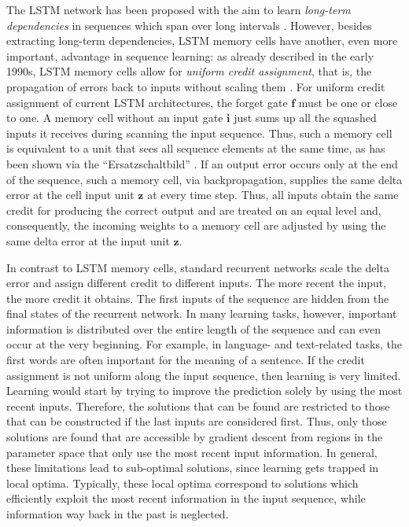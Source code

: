 \documentclass{article}
\newcommand\Bf{\bm{f}}
\newcommand\Bi{\bm{i}}
\newcommand\Bz{\bm{z}}
\begin{document}
\begin{appendices}
The LSTM network has been proposed with the aim
to learn {\em long-term dependencies} in sequences
which span over long intervals
\cite{Hochreiter:97,Hochreiter:97e,Hochreiter:97f,Hochreiter:98}. 
However, besides extracting long-term dependencies, 
LSTM memory cells have another, even
more important, advantage in sequence learning:
as already described in the early 1990s,
LSTM memory cells allow for {\em uniform credit assignment}, that is,
the propagation of errors back to inputs without 
scaling them \cite{Hochreiter:91}. 
For uniform credit assignment of current LSTM architectures,
the forget gate $\Bf$ must be one or close to one.  
A memory cell without an input gate $\Bi$ just sums up all the squashed inputs it
receives during scanning the input sequence.
Thus, such a memory cell is equivalent to a unit that sees all sequence
elements at the same time, as has been shown via 
the ``Ersatzschaltbild'' \cite{Hochreiter:91}.
If an output error occurs only at the end of the sequence,
such a memory cell, via backpropagation, supplies
the same delta error at the cell input unit $\Bz$ at every time
step.
Thus, all inputs obtain the same credit for producing the correct
output and are treated on an equal level and, consequently, the incoming weights to a memory cell 
are adjusted by using the same delta error at the input unit $\Bz$.

In contrast to LSTM memory cells, standard recurrent networks scale
the delta error and assign different credit to different inputs.
The more recent the input, the more credit it obtains.
The first inputs of the sequence are hidden from the final states of
the recurrent network.
In many learning tasks, however, important information is distributed over
the entire length of the sequence and can even occur at the very beginning. For
example, in language- and text-related tasks, 
the first words are often important for the meaning of a sentence. 
If the credit assignment is not uniform along the input sequence, then
learning is very limited. Learning would start by trying to improve
the prediction solely by using the most recent inputs.
Therefore, the solutions that can be found are restricted to those
that can be constructed if the last inputs are considered first.
Thus, only those solutions are found that are accessible by gradient
descent from regions in the parameter space that only use the most recent input information.
In general, these limitations lead to sub-optimal solutions, since 
learning gets trapped in local optima. 
Typically, these local optima correspond to solutions 
which efficiently exploit the most recent information in the input
sequence, while information way back in the past is neglected.


\end{appendices}
\end{document}
